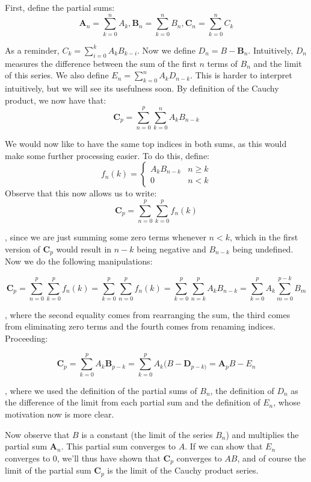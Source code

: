 \begin{solution}
    First, define the partial sums:
    $$\mathbf{A}_n = \sum_{k=0}^{n}A_k, \mathbf{B}_n = \sum_{k=0}^{n}B_n, \mathbf{C}_n = \sum_{k=0}^{n}C_k$$

    As a reminder, $C_k = \sum_{i=0}^{k}A_k B_{k-i}$. Now we define $D_n = B - \mathbf{B}_n$. Intuitively, $D_n$ measures the difference between the sum of the first $n$ terms of $B_n$ and the limit of this series. We also define $E_n = \sum_{k=0}^{n}A_k D_{n-k}$. This is harder to interpret intuitively, but we will see its usefulness soon. By definition of the Cauchy product, we now have that:
    $$\mathbf{C}_p = \sum_{n=0}^{p} \sum_{k=0}^{n} A_k B_{n-k}$$

    We would now like to have the same top indices in both sums, as this would make some further processing easier. To do this, define:
    $$f_n(k) = \left\{ \begin{array}{ll}
         A_k B_{n-k} & n \geq k\\
         0 & n < k
    \end{array}\right.$$
    Observe that this now allows us to write:
    $$\mathbf{C}_p = \sum_{n=0}^{p}\sum_{k=0}^{p}f_n(k)$$

    , since we are just summing some zero terms whenever $n < k$, which in the first version of $\mathbf{C}_p$ would result in $n - k$ being negative and $B_{n-k}$ being undefined. Now we do the following manipulations:

    $$\mathbf{C}_p = \sum_{n=0}^{p}\sum_{k=0}^{p}f_n(k) = \sum_{k=0}^{p}\sum_{n=0}^{p}f_n(k) = \sum_{k=0}^{p}\sum_{n=k}^{p}A_k B_{n-k} = \sum_{k=0}^{p} A_k \sum_{m=0}^{p-k} B_m$$

    , where the second equality comes from rearranging the sum, the third comes from eliminating zero terms and the fourth comes from renaming indices. Proceeding:

    $$\mathbf{C}_p = \sum_{k=0}^{p} A_k \mathbf{B}_{p-k} = \sum_{k=0}^{p} A_k(B - \mathbf{D}_{p-k)} = \mathbf{A}_pB - E_n$$

    , where we used the definition of the partial sums of $B_n$, the definition of $D_n$ as the difference of the limit from each partial sum and the definition of $E_n$, whose motivation now is more clear. 
    
    Now observe that $B$ is a constant (the limit of the series $B_n$) and multiplies the partial sum $\mathbf{A}_n$. This partial sum converges to $A$. If we can show that $E_n$ converges to 0, we'll thus have shown that $\mathbf{C}_p$ converges to $AB$, and of course the limit of the partial sum $\mathbf{C}_p$ is the limit of the Cauchy product series.


\end{solution}
